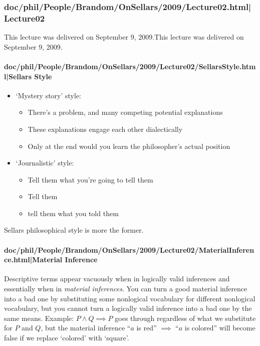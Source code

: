 \documentclass[12pt,a4paper]{report}
\begin{document}
\subsubsection{doc/phil/People/Brandom/OnSellars/2009/Lecture02.html|Lecture02}
This lecture was delivered on September 9, 2009.This lecture was delivered on September 9, 2009.

\paragraph{doc/phil/People/Brandom/OnSellars/2009/Lecture02/SellarsStyle.html|Sellars Style}

\begin{itemize}
\item `Mystery story' style:
    \begin{itemize}
        \item There's a problem, and many competing potential explanations
        \item These explanations engage each other dialectically
        \item Only at the end would you learn the philosopher's actual position
    \end{itemize}
\item `Journalistic' style:
    \begin{itemize}
        \item Tell them what you're going to tell them
        \item Tell them
        \item tell them what you told them
    \end{itemize}
\end{itemize}

Sellars philosophical style is more the former.
\paragraph{doc/phil/People/Brandom/OnSellars/2009/Lecture02/MaterialInference.html|Material Inference}

Descriptive terms appear vacuously when in logically valid inferences and essentially when in \emph{material inferences}. You can turn a good material inference into a bad one by substituting some nonlogical vocabulary for different nonlogical vocabulary, but you cannot turn a logically valid inference into a bad one by the same means. Example: $P \land Q \implies P$ goes through regardless of what we substitute for $P$ and $Q$, but the material inference ``$a$ is red'' $\implies$ ``$a$ is colored'' will become false if we replace `colored' with `square'.
\end{document}
